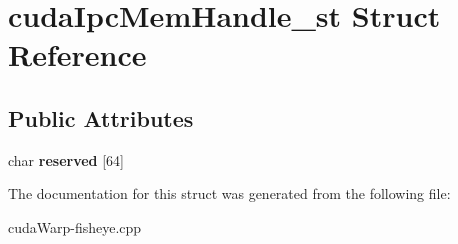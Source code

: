 \hypertarget{structcudaIpcMemHandle__st}{}\section{cuda\+Ipc\+Mem\+Handle\+\_\+st Struct Reference}
\label{structcudaIpcMemHandle__st}
\subsection*{Public Attributes}
\begin{DoxyCompactItemize}
\item 
char {\bfseries reserved} \mbox{[}64\mbox{]}\hypertarget{structcudaIpcMemHandle__st_aeb252559a8bc3b451c4734b5ebca8e49}{}\label{structcudaIpcMemHandle__st_aeb252559a8bc3b451c4734b5ebca8e49}

\end{DoxyCompactItemize}


The documentation for this struct was generated from the following file\+:\begin{DoxyCompactItemize}
\item 
cuda\+Warp-\/fisheye.\+cpp\end{DoxyCompactItemize}
